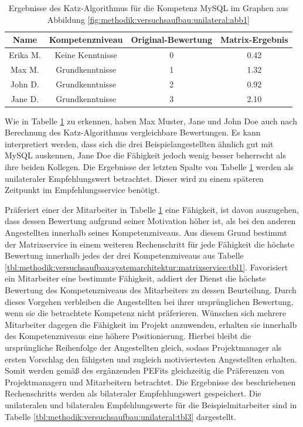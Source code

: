 \begin{table}[h]
	\centering
	\begin{tabular}{c|c|c|c}
		\textbf{Name} & \textbf{Kompetenzniveau} & \textbf{Original-Bewertung} & \textbf{Matrix-Ergebnis} \\
		\hline
		\rowcolor{exxetagray}Erika M. & Keine Kenntnisse & 0 & 0.42\\
		\hline
		\rowcolor{itemcolor}Max M.    & Grundkenntnisse  & 1 & 1.32\\
		\rowcolor{itemcolor}John D.   & Grundkenntnisse  & 2 & 0.92\\
		\rowcolor{itemcolor}Jane D.   & Grundkenntnisse  & 3 & 2.10
	\end{tabular}
	\caption{Ergebnisse des Katz-Algorithmus für die Kompetenz MySQL im Graphen aus Abbildung \ref{fig:methodik:versuchsaufbau:unilateral:abb1}}
	\label{tbl:methodik:versuchsaufbau:unilateral:tbl1}
\end{table}

Wie in Tabelle \ref{tbl:methodik:versuchsaufbau:unilateral:tbl1} zu erkennen, haben Max Muster, Jane und John Doe auch nach Berechnung des Katz-Algorithmus vergleichbare Bewertungen. Es kann interpretiert werden, dass sich die drei Beispielangestellten ähnlich gut mit MySQL auskennen, Jane Doe die Fähigkeit jedoch wenig besser beherrscht als ihre beiden Kollegen. Die Ergebnisse der letzten Spalte von Tabelle \ref{tbl:methodik:versuchsaufbau:unilateral:tbl1} werden als unilateraler Empfehlungswert betrachtet. Dieser wird zu einem späteren Zeitpunkt im Empfehlungsservice benötigt.

Präferiert einer der Mitarbeiter in Tabelle \ref{tbl:methodik:versuchsaufbau:unilateral:tbl1} eine Fähigkeit, ist davon auszugehen, dass dessen Bewertung aufgrund seiner Motivation höher ist, als bei den anderen Angestellten innerhalb seines Kompetenzniveaus. Aus diesem Grund bestimmt der Matrixservice in einem weiteren Rechenschritt für jede Fähigkeit die höchste Bewertung innerhalb jedes der drei Kompetenzniveaus aus Tabelle \ref{tbl:methodik:versuchsaufbau:systemarchitektur:matrixservice:tbl1}. Favorisiert ein Mitarbeiter eine bestimmte Fähigkeit, addiert der Dienst die höchste Bewertung des Kompetenzniveaus des Mitarbeiters zu dessen Beurteilung. Durch dieses Vorgehen verbleiben die Angestellten bei ihrer ursprünglichen Bewertung, wenn sie die betrachtete Kompetenz nicht präferieren. Wünschen sich mehrere Mitarbeiter dagegen die Fähigkeit im Projekt anzuwenden, erhalten sie innerhalb des Kompetenzniveaus eine höhere Positionierung. Hierbei bleibt die ursprüngliche Reihenfolge der Angestellten gleich, sodass Projektmanager als ersten Vorschlag den fähigsten und zugleich motiviertesten Angestellten erhalten. Somit werden gemäß des ergänzenden \acp{PEFit} gleichzeitig die Präferenzen von Projektmanagern und Mitarbeitern betrachtet. Die Ergebnisse des beschriebenen Rechenschritts werden als bilateraler Empfehlungswert gespeichert. Die unilateralen und bilateralen Empfehlungswerte für die Beispielmitarbeiter sind in Tabelle \ref{tbl:methodik:versuchsaufbau:unilateral:tbl3} dargestellt.

